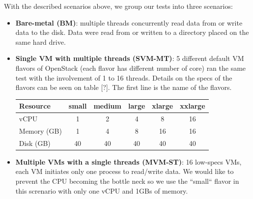 \documentclass{acmsig}
\begin{document}
With the described scenarios above, we group our tests into three scenarios:
\begin{itemize}
  \item \textbf{Bare-metal (BM)}: multiple threads concurrently read data from or write data to the disk. Data were read from or written to a directory placed on the same hard drive.

  \item \textbf{Single VM with multiple threads (SVM-MT)}: 5 different default VM flavors of OpenStack (each flavor has different number of core) ran the same test with the involvement of 1 to 16 threads. Details on the specs of the flavors can be seen on table [?]. The first line is the name of the flavors.
      \begin{table}[h!]
      \begin{tabular}{|l|c|c|c|c|c|}
      \hline
      Resource & small & medium & large & xlarge & xxlarge \\
      \hline
      vCPU & 1 & 2 & 4 & 8 & 16 \\
      Memory (GB)& 1 & 4 & 8 & 16 & 16 \\
      Disk (GB)& 40 & 40 & 40 & 40 & 40 \\
      \hline
      \end{tabular}
      \end{table}
  \item \textbf{Multiple VMs with a single threads (MVM-ST)}: 16 low-specs VMs, each VM initiates only one process to read/write data. We would like to prevent the CPU becoming the bottle neck so we use the ``small`` flavor in this screnario with only one vCPU and 1GBs of memory.
\end{itemize}
\end{document}
